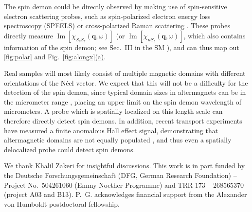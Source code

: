 \documentclass[aps,prl,reprint,twocolumns,superscriptaddress]{revtex4-2}
\DeclareMathOperator{\Imm}{Im}
\newcommand{\subfigref}[2]{Fig.~\hyperref[#1]{\ref*{#1}#2}}
\begin{document}
	
	
	The spin demon could be directly observed by making use of spin-sensitive electron scattering probes, such as spin-polarized electron energy loss spectroscopy (SPEELS) \cite{plihalSpinWaveSignature1999} or cross-polarized Raman scattering \cite{kimPolarizedRamanSpectroscopy2020}. These probes directly measure $\Imm[\chi_{S_zS_z}(\bm q,\omega)]$ (or $\Imm[\chi_{nS_z}(\bm q,\omega)]$, which also contains information of the spin demon; see Sec.~III in the SM \cite{Note1}), and can thus map out \cref{fig:polar} and \subfigref{fig:alongx}{(a)}.
	
	Real samples will most likely consist of multiple magnetic domains with different orientations of the N\'eel vector. We expect that this will not be a difficulty for the detection of the spin demon, since typical domain sizes in altermagnets can be in the micrometer range \cite{aminNanoscaleImagingControl2024a}, placing an upper limit on the spin demon wavelength of micrometers. A probe which is spatially localized on this length scale can therefore directly detect spin demons. In addition, recent transport experiments have measured a finite anomalous Hall effect signal, demonstrating that altermagnetic domains are not equally populated \cite{jeongMetallicityAnomalousHall2025a,leiviskaAnisotropyAnomalousHall2024, reichlovaObservationSpontaneousAnomalous2024a}, and thus even a spatially delocalized probe could detect spin demons.
	\begin{acknowledgments}
		We thank Khalil Zakeri for insightful discussions. This work is in part funded by the Deutsche Forschungsgemeinschaft (DFG, German Research Foundation) -- Project No.~504261060 (Emmy Noether Programme) and TRR 173 -- 268565370 (project A03 and B13). P.~G. acknowledges financial support from the Alexander von Humboldt postdoctoral fellowship. 
	\end{acknowledgments}
	
\end{document}
